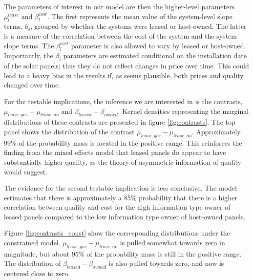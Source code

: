 \documentclass[a4paper]{article}
\begin{document}
The parameters of interest in our model are then the higher-level parameters $\mu_l^{lease}$ and $\beta_l^{cost}$. The first represents the mean value of the system-level slope terms, $b_s$, grouped by whether the systems were leased or host-owned. The latter is a measure of the correlation between the cost of the system and the system slope terms. The $\beta_l^{cost}$ parameter is also allowed to vary by leased or host-owned. Importantly, the $\beta_l$ parameters are estimated conditional on the installation date of the solar panels; thus they do not reflect changes in price over time. This could lead to a heavy bias in the results if, as seems plausible, both prices and quality changed over time.

For the testable implications, the inference we are interested in is the contrasts, $\mu_{lease, yes} - \mu_{lease, no}$ and $\beta_{leased}- \beta_{owned}$. Kernel densities representing the marginal distributions of these contrasts are presented in figure \ref{fig:contrasts}. The top panel shows the distribution of the contrast $\mu_{lease, yes} - \mu_{lease, no}$. Approximately 99\% of the probability mass is located in the positive range. This reinforces the finding from the mixed effects model that leased panels do appear to have substantially higher quality, as the theory of asymmetric information of quality would suggest.

The evidence for the second testable implication is less conclusive. The model estimates that there is approximately a 85\% probability that there is a higher correlation between quality and cost for the high information type owner of leased panels compared to the low information type owner of host-owned panels.

Figure \ref{fig:contrasts_const} show the corresponding distributions under the constrained model. $\mu_{lease, yes} - \mu_{lease, no}$ is pulled somewhat towards zero in magnitude, but about 95\% of the probability mass is still in the positive range. The distribution of  $\beta_{leased}- \beta_{owned}$ is also pulled towards zero, and now is centered close to zero.
\end{document}
